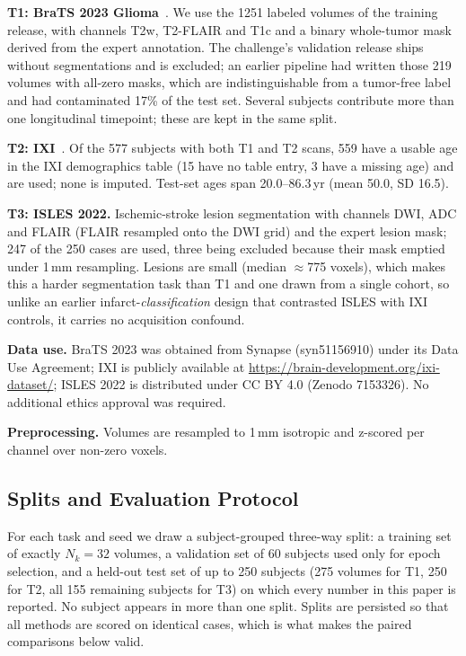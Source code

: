 \documentclass[journal,twoside,web]{ieeecolor}
\begin{document}
\textbf{T1: BraTS 2023 Glioma}~\cite{brats2023}. We use the 1251 labeled volumes of the training release, with channels T2w, T2-FLAIR and T1c and a binary whole-tumor mask derived from the expert annotation. The challenge's validation release ships without segmentations and is excluded; an earlier pipeline had written those 219 volumes with all-zero masks, which are indistinguishable from a tumor-free label and had contaminated 17\% of the test set. Several subjects contribute more than one longitudinal timepoint; these are kept in the same split.

\textbf{T2: IXI}~\cite{ixi}. Of the 577 subjects with both T1 and T2 scans, 559 have a usable age in the IXI demographics table (15 have no table entry, 3 have a missing age) and are used; none is imputed. Test-set ages span 20.0--86.3\,yr (mean 50.0, SD 16.5).

\textbf{T3: ISLES 2022.} Ischemic-stroke lesion segmentation with channels DWI, ADC and FLAIR (FLAIR resampled onto the DWI grid) and the expert lesion mask; 247 of the 250 cases are used, three being excluded because their mask emptied under 1\,mm resampling. Lesions are small (median $\approx$775 voxels), which makes this a harder segmentation task than T1 and one drawn from a single cohort, so unlike an earlier infarct-\emph{classification} design that contrasted ISLES with IXI controls, it carries no acquisition confound.

\textbf{Data use.} BraTS 2023 was obtained from Synapse (syn51156910) under its Data Use Agreement; IXI is publicly available at \url{https://brain-development.org/ixi-dataset/}; ISLES 2022 is distributed under CC BY 4.0 (Zenodo 7153326). No additional ethics approval was required.

\textbf{Preprocessing.} Volumes are resampled to 1\,mm isotropic and z-scored per channel over non-zero voxels.

\subsection{Splits and Evaluation Protocol}
\label{sec:protocol}

For each task and seed we draw a subject-grouped three-way split: a training set of exactly $N_k=32$ volumes, a validation set of 60 subjects used only for epoch selection, and a held-out test set of up to 250 subjects (275 volumes for T1, 250 for T2, all 155 remaining subjects for T3) on which every number in this paper is reported. No subject appears in more than one split. Splits are persisted so that all methods are scored on identical cases, which is what makes the paired comparisons below valid.
\end{document}
